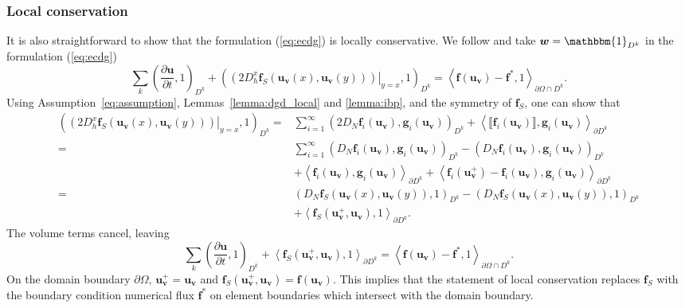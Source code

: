 \documentclass[preprint,10pt]{article}
\theoremstyle{definition}
\theoremstyle{lemma}
\theoremstyle{theorem}
\theoremstyle{assumption}
\newcommand{\pd}[2]{\frac{\partial#1}{\partial#2}}
\newcommand{\LRp}[1]{\left( #1 \right)}
\newcommand{\LRa}[1]{\left\langle #1 \right\rangle}
\newcommand{\jump}[1] {\ensuremath{\llbracket#1\rrbracket}}
\newcommand{\note}[1]{{\color{blue}{#1}}}
\begin{document}

\subsubsection{Local conservation}

It is also straightforward to show that the formulation (\ref{eq:ecdg}) is locally conservative.  We follow \cite{chen2017entropy} and take $\bm{w} = \mathbbm{1}_{D^k}$ in the formulation (\ref{eq:ecdg})
\[
\sum_{k}\LRp{\pd{\bm{u}}{t},1}_{D^k} + \LRp{\left.\LRp{2D^x_h\bm{f}_S(\bm{u}_{\bm{v}}(x),\bm{u}_{\bm{v}}(y))}\right|_{y=x},1}_{D^k} = \LRa{\bm{f}(\bm{u}_{\bm{v}})-\bm{f}^*,1}_{\partial \Omega \cap D^k}.  
\]
Using Assumption~\ref{eq:assumption}, Lemmas~\ref{lemma:dgd_local} and \ref{lemma:ibp}, and the symmetry of $\bm{f}_S$, one can show that
\begin{align*}
\LRp{\left.\LRp{2D^x_h\bm{f}_S(\bm{u}_{\bm{v}}(x),\bm{u}_{\bm{v}}(y))}\right|_{y=x},1}_{D^k} =& \sum_{i=1}^{\infty} \LRp{2D_N \bm{f}_i(\bm{u}_{\bm{v}}),\bm{g}_i(\bm{u}_{\bm{v}})}_{D^k} + \LRa{\jump{\bm{f}_i(\bm{u}_{\bm{v}})},\bm{g}_i(\bm{u}_{\bm{v}})}_{\partial D^k}\\
=& \sum_{i=1}^{\infty} \LRp{D_N \bm{f}_i(\bm{u}_{\bm{v}}),\bm{g}_i(\bm{u}_{\bm{v}})}_{D^k} - \LRp{D_N \bm{f}_i(\bm{u}_{\bm{v}}),\bm{g}_i(\bm{u}_{\bm{v}})}_{D^k} \\
&+ \LRa{\bm{f}_i(\bm{u}_{\bm{v}}),\bm{g}_i(\bm{u}_{\bm{v}})}_{\partial D^k} + \LRa{\bm{f}_i(\bm{u}_{\bm{v}}^+)-\bm{f}_i(\bm{u}_{\bm{v}}),\bm{g}_i(\bm{u}_{\bm{v}})}_{\partial D^k}\\
=& \LRp{D_N \bm{f}_S(\bm{u}_{\bm{v}}(x),\bm{u}_{\bm{v}}(y)),1}_{D^k} -  \LRp{D_N \bm{f}_S(\bm{u}_{\bm{v}}(x),\bm{u}_{\bm{v}}(y)),1}_{D^k}\\
&+ \LRa{\bm{f}_S(\bm{u}_{\bm{v}}^+,\bm{u}_{\bm{v}}),1}_{\partial D^k}.
\end{align*}
The volume terms cancel, leaving 
\[
\sum_{k}\LRp{\pd{\bm{u}}{t},1}_{D^k} + \LRa{\bm{f}_S(\bm{u}_{\bm{v}}^+,\bm{u}_{\bm{v}}),1}_{\partial D^k} = \LRa{\bm{f}(\bm{u}_{\bm{v}})-\bm{f}^*,1}_{\partial \Omega \cap D^k}.  
\]
On the domain boundary $\partial \Omega$, $\bm{u}_{\bm{v}}^+ = \bm{u}_{\bm{v}}$ and $\bm{f}_S(\bm{u}_{\bm{v}}^+,\bm{u}_{\bm{v}}) = \bm{f}(\bm{u}_{\bm{v}})$.  This implies that the statement of local conservation replaces $\bm{f}_S$ with the boundary condition numerical flux $\bm{f}^*$ on element boundaries which intersect with the domain boundary.  
\end{document}
